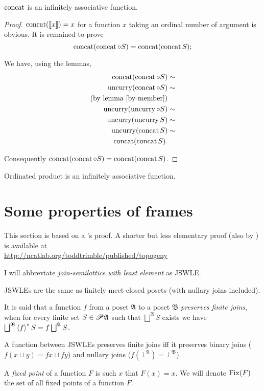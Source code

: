 \begin{thm}
$\operatorname{concat}$ is an infinitely associative function.\end{thm}
\begin{proof}
$\operatorname{concat}(\llbracket x\rrbracket)=x$ for a function $x$ taking an
ordinal number of argument is obvious. It is remained to prove
\[
\operatorname{concat}(\operatorname{concat}\circ S)=\operatorname{concat}(\operatorname{concat} S);
\]


We have, using the lemmas,
\begin{align*}
\concat(\concat\circ S) & \sim\\
\uncurry(\concat\circ S) & \sim\\
\text{(by lemma \ref{by-member})}\\
\uncurry(\uncurry\circ S) & \sim\\
\uncurry(\uncurry S) & \sim\\
\uncurry(\concat S) & \sim\\
\concat(\concat S).
\end{align*}


Consequently $\operatorname{concat}(\operatorname{concat}\circ S)=\operatorname{concat}(\operatorname{concat} S)$.\end{proof}
\begin{cor}
Ordinated product is an infinitely associative function.
\end{cor}

\section{Some properties of frames}

This section is based on a 's proof. A shorter
but less elementary proof (also by ) is available
at\\
\href{http://ncatlab.org/toddtrimble/published/topogeny}{http://ncatlab.org/toddtrimble/published/topogeny}

I will abbreviate \emph{join-semilattice with least element} as JSWLE.
\begin{obvious}
JSWLEs are the same as finitely meet-closed posets (with nullary joins
included).
\end{obvious}

\begin{defn}
It is said that a function $f$ from a poset $\mathfrak{A}$ to a
poset $\mathfrak{B}$ \emph{preserves finite joins}, when for every
finite set $S\in\mathscr{P}\mathfrak{A}$ such that $\bigsqcup^{\mathfrak{A}}S$
exists we have $\bigsqcup^{\mathfrak{B}}\left\langle f\right\rangle^{\ast}S=f\bigsqcup^{\mathfrak{A}}S$.\end{defn}
\begin{obvious}
A function between JSWLEs preserves finite joins iff it preserves
binary joins ($f(x\sqcup y)=fx\sqcup fy$) and nullary joins ($f(\bot^{\mathfrak{A}})=\bot^{\mathfrak{B}}$).\end{obvious}
\begin{defn}
A \emph{fixed point} of a function $F$ is such $x$ that $F(x)=x$.
We will denote $\operatorname{Fix}(F)$ the set of all fixed points of a function
$F$.
\end{defn}

